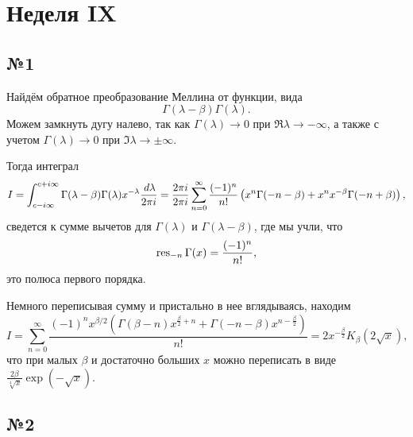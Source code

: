 \section{Неделя IX}

\subsection*{№1}
Найдём обратное преобразование Меллина от функции, вида
\begin{equation*}
	\Gamma(\lambda - \beta) \Gamma(\lambda).
\end{equation*}
Можем замкнуть дугу налево, так как $\Gamma(\lambda) \to 0$ при $\Re \lambda \to - \infty$, а также с учетом $\Gamma(\lambda) \to 0$ при $\Im \lambda \to \pm \infty$.

Тогда интеграл
\begin{equation*}
	I = \int_{c-i \infty}^{c + i \infty} \Gamma(\lambda - \beta) \Gamma(\lambda) x^{-\lambda}\frac{\, d  \lambda}{2 \pi i} = 
	\frac{2 \pi i}{2 \pi i} \sum_{n=0}^{\infty} \frac{(-1)^n}{n!} \left(
		x^n \Gamma(-n-\beta) + x^n x^{-\beta} \Gamma(-n + \beta)
	\right),
\end{equation*}
сведется к сумме вычетов для $\Gamma(\lambda)$ и $\Gamma(\lambda-\beta)$, где мы учли, что 
\begin{equation*}
	\mathop{\mathrm{res}}\nolimits_{-n} \Gamma(x) = \frac{(-1)^n}{n!},
\end{equation*}
это полюса первого порядка.

Немного переписывая сумму и пристально в нее вглядываясь, находим
\begin{equation*}
	I = \sum_{n=0}^{\infty}
	\frac{(-1)^n x^{\beta /2} \left(\Gamma (\beta -n) x^{\frac{\beta }{2}+n}+\Gamma (-n-\beta ) x^{n-\frac{\beta }{2}}\right)}{n!} = 2 x^{-\frac{\beta }{2}} K_{\beta }\left(2 \sqrt{x}\right),
\end{equation*}
что при малых $\beta$ и достаточно больших $x$ можно переписать в виде $ \frac{2 \beta}{\sqrt[4]{x}} \exp \left(-\sqrt{x}\right)$.


\subsection*{№2}

